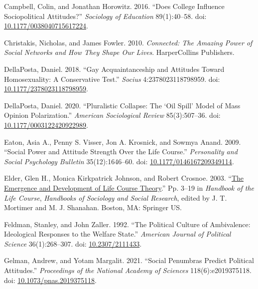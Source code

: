 \documentclass[
  11pt,
]{article}
\newlength{\cslhangindent}
\newenvironment{CSLReferences}[2] %
 {\begin{list}{}{%
  \setlength{\itemindent}{0pt}
  \setlength{\leftmargin}{0pt}
  \setlength{\parsep}{0pt}
  \ifodd #1
   \setlength{\leftmargin}{\cslhangindent}
   \setlength{\itemindent}{-1\cslhangindent}
  \fi
  \setlength{\itemsep}{#2\baselineskip}}}
 {\end{list}}
\begin{document}
\begin{CSLReferences}{1}{1}
Campbell, Colin, and Jonathan Horowitz. 2016. {``Does {College}
{Influence} {Sociopolitical} {Attitudes}?''} \emph{Sociology of
Education} 89(1):40--58. doi:
\href{https://doi.org/10.1177/0038040715617224}{10.1177/0038040715617224}.

Christakis, Nicholas, and James Fowler. 2010. \emph{Connected: {The}
{Amazing} {Power} of {Social} {Networks} and {How} {They} {Shape} {Our}
{Lives}}. HarperCollins Publishers.

DellaPosta, Daniel. 2018. {``Gay {Acquaintanceship} and {Attitudes}
Toward {Homosexuality}: {A} {Conservative} {Test}.''} \emph{Socius}
4:2378023118798959. doi:
\href{https://doi.org/10.1177/2378023118798959}{10.1177/2378023118798959}.

DellaPosta, Daniel. 2020. {``Pluralistic {Collapse}: {The} {`{Oil}
{Spill}'} {Model} of {Mass} {Opinion} {Polarization}.''} \emph{American
Sociological Review} 85(3):507--36. doi:
\href{https://doi.org/10.1177/0003122420922989}{10.1177/0003122420922989}.

Eaton, Asia A., Penny S. Visser, Jon A. Krosnick, and Sowmya Anand.
2009. {``Social {Power} and {Attitude} {Strength} {Over} the {Life}
{Course}.''} \emph{Personality and Social Psychology Bulletin}
35(12):1646--60. doi:
\href{https://doi.org/10.1177/0146167209349114}{10.1177/0146167209349114}.

Elder, Glen H., Monica Kirkpatrick Johnson, and Robert Crosnoe. 2003.
{``\href{https://doi.org/10.1007/978-0-306-48247-2_1}{The {Emergence}
and {Development} of {Life} {Course} {Theory}}.''} Pp. 3--19 in
\emph{Handbook of the {Life} {Course}}, \emph{Handbooks of {Sociology}
and {Social} {Research}}, edited by J. T. Mortimer and M. J. Shanahan.
Boston, MA: Springer US.

Feldman, Stanley, and John Zaller. 1992. {``The {Political} {Culture} of
{Ambivalence}: {Ideological} {Responses} to the {Welfare} {State}.''}
\emph{American Journal of Political Science} 36(1):268--307. doi:
\href{https://doi.org/10.2307/2111433}{10.2307/2111433}.

Gelman, Andrew, and Yotam Margalit. 2021. {``Social Penumbras Predict
Political Attitudes.''} \emph{Proceedings of the National Academy of
Sciences} 118(6):e2019375118. doi:
\href{https://doi.org/10.1073/pnas.2019375118}{10.1073/pnas.2019375118}.


\end{CSLReferences}
\end{document}
